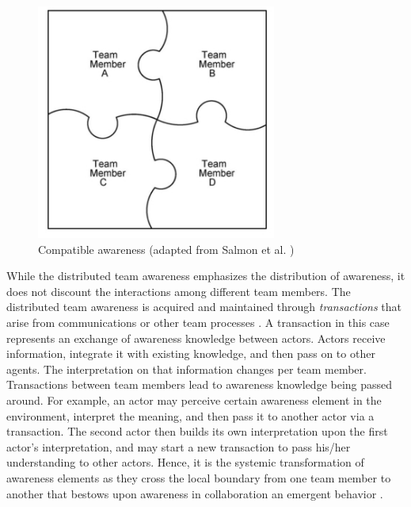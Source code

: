 \begin{figure}[htbp] %
   \centering
   \includegraphics[width=3.1in]{compatible_awareness.jpg} 
   \caption{Compatible awareness (adapted from Salmon et al. \cite{Stanton2009})}
   \label{fig:compatible_awareness}
\end{figure}

While the distributed team awareness emphasizes the distribution of awareness, it does not discount the interactions among different team members. The distributed team awareness is acquired and maintained through \emph{transactions} that arise from communications or other team processes \cite{Salmon2010}. A transaction in this case represents an exchange of awareness knowledge between actors. Actors receive information, integrate it with existing knowledge, and then pass on to other agents. The interpretation on that information changes per team member. Transactions between team members lead to awareness knowledge being passed around. For example, an actor may perceive certain awareness element in the environment, interpret the meaning, and then pass it to another actor via a transaction. The second actor then builds its own interpretation upon the first actor's interpretation, and may start a new transaction to pass his/her understanding to other actors. Hence, it is the systemic transformation of awareness elements as they cross the local boundary from one team member to another that bestows upon awareness in collaboration an emergent behavior \cite{Stanton2009}.


